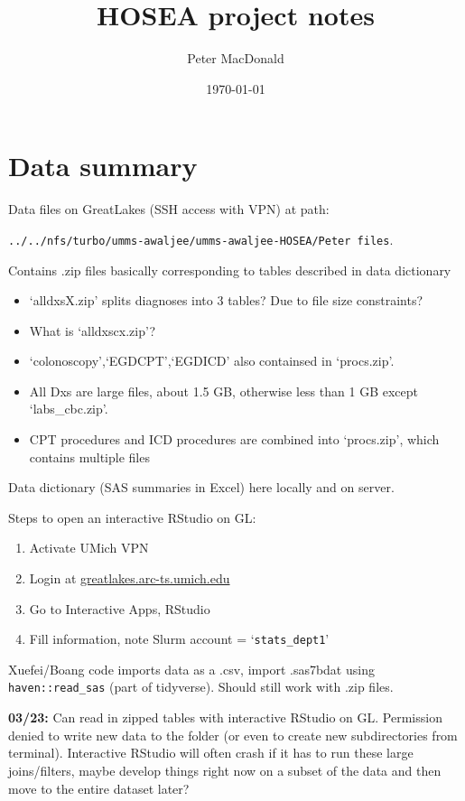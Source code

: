 \documentclass[12pt]{article}
\title{HOSEA project notes}
\author{Peter MacDonald}
\date{\today}
\begin{document}
\maketitle

\section*{Data summary}

Data files on GreatLakes (SSH access with VPN) at path:
\begin{center}
  \texttt{../../nfs/turbo/umms-awaljee/umms-awaljee-HOSEA/Peter files}.
\end{center}

Contains .zip files basically corresponding to tables described in data dictionary
\begin{itemize}
  \item `alldxsX.zip' splits diagnoses into 3 tables? Due to file size constraints?
  \item What is `alldxscx.zip'?
  \item `colonoscopy',`EGDCPT',`EGDICD' also containsed in `procs.zip'.
  \item All Dxs are large files, about 1.5 GB, otherwise less than 1 GB except `labs\_cbc.zip'.
  \item CPT procedures and ICD procedures are combined into `procs.zip', which contains multiple files
\end{itemize}
Data dictionary (SAS summaries in Excel) here locally and on server.

Steps to open an interactive RStudio on GL:
\begin{enumerate}
  \item Activate UMich VPN
  \item Login at \url{greatlakes.arc-ts.umich.edu}
  \item Go to Interactive Apps, RStudio
  \item Fill information, note Slurm account = `\texttt{stats\_dept1}'
\end{enumerate}

Xuefei/Boang code imports data as a .csv, import .sas7bdat using \texttt{haven::read\_sas} (part of tidyverse). Should still work with .zip files.

{\bf 03/23:} Can read in zipped tables with interactive RStudio on GL. Permission denied to write new data to the folder (or even to create new subdirectories from terminal). Interactive RStudio will often crash if it has to run these large joins/filters, maybe develop things right now on a subset of the data and then move to the entire dataset later?
\end{document}
